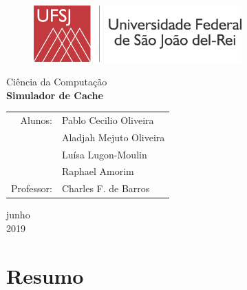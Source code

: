 \documentclass[a4paper,12pt]{article}
\begin{document}

\begin{titlepage}
	\begin{center}
	
	\begin{figure}[!ht]
	\centering
	\includegraphics[width=8cm]{UFSJ_vLogo.png}
	\end{figure}
		\large{Ciência da Computação}\\
		\vspace{15pt}
        \vspace{95pt}
        \textbf{\LARGE{Simulador de Cache}}\\
		\vspace{3,5cm}
	\end{center}
	
	\begin{flushleft}
		\begin{tabular}{rl}
			Alunos:&Pablo Cecilio Oliveira\\
			&Aladjah Mejuto Oliveira\\
			&Luísa Lugon-Moulin\\
			&Raphael Amorim\\
			Professor:&Charles F. de Barros\\
	    \end{tabular}
    \end{flushleft}
	\vspace{1cm}
	
	\begin{center}
		\vspace{\fill}
            junho\\
            2019
    \end{center}
\end{titlepage}
\newpage
\tableofcontents
\thispagestyle{empty}

\newpage
{}
\section{Resumo}
\newpage
\end{document}
